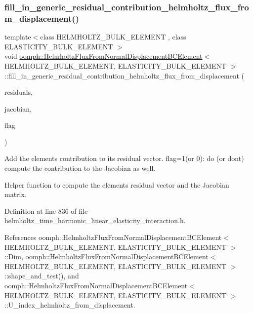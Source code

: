 \subsubsection{\texorpdfstring{fill\+\_\+in\+\_\+generic\+\_\+residual\+\_\+contribution\+\_\+helmholtz\+\_\+flux\+\_\+from\+\_\+displacement()}{fill\_in\_generic\_residual\_contribution\_helmholtz\_flux\_from\_displacement()}}
{\footnotesize\ttfamily template$<$class H\+E\+L\+M\+H\+O\+L\+T\+Z\+\_\+\+B\+U\+L\+K\+\_\+\+E\+L\+E\+M\+E\+NT , class E\+L\+A\+S\+T\+I\+C\+I\+T\+Y\+\_\+\+B\+U\+L\+K\+\_\+\+E\+L\+E\+M\+E\+NT $>$ \\
void \hyperlink{classoomph_1_1HelmholtzFluxFromNormalDisplacementBCElement}{oomph\+::\+Helmholtz\+Flux\+From\+Normal\+Displacement\+B\+C\+Element}$<$ H\+E\+L\+M\+H\+O\+L\+T\+Z\+\_\+\+B\+U\+L\+K\+\_\+\+E\+L\+E\+M\+E\+NT, E\+L\+A\+S\+T\+I\+C\+I\+T\+Y\+\_\+\+B\+U\+L\+K\+\_\+\+E\+L\+E\+M\+E\+NT $>$\+::fill\+\_\+in\+\_\+generic\+\_\+residual\+\_\+contribution\+\_\+helmholtz\+\_\+flux\+\_\+from\+\_\+displacement (\begin{DoxyParamCaption}\item[{Vector$<$ double $>$ \&}]{residuals,  }\item[{Dense\+Matrix$<$ double $>$ \&}]{jacobian,  }\item[{const unsigned \&}]{flag }\end{DoxyParamCaption})\hspace{0.3cm}{\ttfamily [private]}}



Add the element\textquotesingle{}s contribution to its residual vector. flag=1(or 0)\+: do (or don\textquotesingle{}t) compute the contribution to the Jacobian as well. 

Helper function to compute the element\textquotesingle{}s residual vector and the Jacobian matrix. 

Definition at line 836 of file helmholtz\+\_\+time\+\_\+harmonic\+\_\+linear\+\_\+elasticity\+\_\+interaction.\+h.



References oomph\+::\+Helmholtz\+Flux\+From\+Normal\+Displacement\+B\+C\+Element$<$ H\+E\+L\+M\+H\+O\+L\+T\+Z\+\_\+\+B\+U\+L\+K\+\_\+\+E\+L\+E\+M\+E\+N\+T, E\+L\+A\+S\+T\+I\+C\+I\+T\+Y\+\_\+\+B\+U\+L\+K\+\_\+\+E\+L\+E\+M\+E\+N\+T $>$\+::\+Dim, oomph\+::\+Helmholtz\+Flux\+From\+Normal\+Displacement\+B\+C\+Element$<$ H\+E\+L\+M\+H\+O\+L\+T\+Z\+\_\+\+B\+U\+L\+K\+\_\+\+E\+L\+E\+M\+E\+N\+T, E\+L\+A\+S\+T\+I\+C\+I\+T\+Y\+\_\+\+B\+U\+L\+K\+\_\+\+E\+L\+E\+M\+E\+N\+T $>$\+::shape\+\_\+and\+\_\+test(), and oomph\+::\+Helmholtz\+Flux\+From\+Normal\+Displacement\+B\+C\+Element$<$ H\+E\+L\+M\+H\+O\+L\+T\+Z\+\_\+\+B\+U\+L\+K\+\_\+\+E\+L\+E\+M\+E\+N\+T, E\+L\+A\+S\+T\+I\+C\+I\+T\+Y\+\_\+\+B\+U\+L\+K\+\_\+\+E\+L\+E\+M\+E\+N\+T $>$\+::\+U\+\_\+index\+\_\+helmholtz\+\_\+from\+\_\+displacement.



